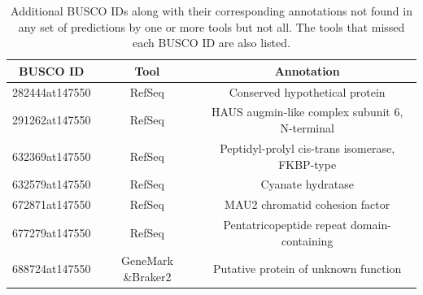 \begin{table}[h]
  \centering
  \begin{tabular}{|c|c|c|}
    \hline
    BUSCO ID & Tool & Annotation \\ \hline
    282444at147550 & RefSeq & Conserved hypothetical protein \\ \hline
    291262at147550 & RefSeq & HAUS augmin-like complex subunit 6, N-terminal \\ \hline
    632369at147550 & RefSeq & Peptidyl-prolyl cis-trans isomerase, FKBP-type \\ \hline
    632579at147550 & RefSeq & Cyanate hydratase \\ \hline
    672871at147550 & RefSeq & MAU2 chromatid cohesion factor \\ \hline
    677279at147550 & RefSeq & Pentatricopeptide repeat domain-containing \\ \hline
    688724at147550 & GeneMark \&Braker2 & Putative protein of unknown function \\ \hline
  \end{tabular}
  \caption[Additional missing BUSCO IDs]{Additional BUSCO IDs along with their corresponding annotations not found in any set of predictions by one or more tools but not all. The tools that missed each BUSCO ID are also listed.}\label{table:missed-all-gf}
\end{table}

